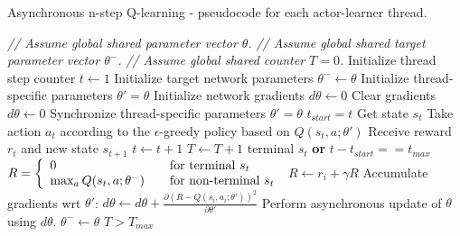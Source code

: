 \documentclass{article} \usepackage{times}
\begin{document}
 
\begin{algorithm}[h]
\caption{Asynchronous n-step Q-learning - pseudocode for each actor-learner thread.}
\begin{algorithmic}
\small
\State \emph{// Assume global shared parameter vector $\theta$.}
\State \emph{// Assume global shared target parameter vector $\theta^-$.}
\State \emph{// Assume global shared counter $T=0$.}
\State Initialize thread step counter $t\gets 1$
\State Initialize target network parameters $\theta^- \gets \theta$
\State Initialize thread-specific parameters $\theta' = \theta$
\State Initialize network gradients $d\theta \gets 0$
\Repeat
\State Clear gradients $d\theta \gets 0$
\State Synchronize thread-specific parameters $\theta'=\theta$
\State $t_{start} = t$
\State Get state $s_t$
\Repeat
\State Take action $a_t$ according to the $\epsilon$-greedy policy based on $Q(s_t,a;\theta')$
\State Receive reward $r_t$ and new state $s_{t+1}$
\State $t \gets t + 1$
\State $T \gets T + 1$
\Until terminal $s_t$ \textbf{or} $t - t_{start} == t_{max}$
\State $R =
    \left\{
    \begin{array}{l l}
      0  \quad & \text{for terminal } s_t\\
      \max_a Q(s_t,a;\theta^-) \quad & \text{for non-terminal } s_t
    \end{array} \right.$
\State $R \gets r_i + \gamma R$
\State Accumulate gradients wrt $\theta'$: $d\theta \gets d\theta + \frac{\partial\left(R - Q(s_i,a_i;\theta')\right)^2}{\partial \theta'}$
\EndFor
\State Perform asynchronous update of $\theta$ using $d\theta$.
\State $\theta^- \gets \theta$
\EndIf
\Until $T > T_{max}$
\end{algorithmic}
\label{alg:msq}
\end{algorithm}
\end{document}
